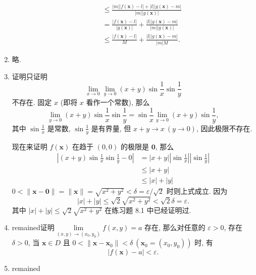 \begin{enumerate}
\begin{enumerate}[(1)]
\begin{align*}
                    &\leqslant \frac{|m||f(\boldsymbol{x}) - l| + |l||g(\boldsymbol{x}) - m|}{|m||g(\boldsymbol{x})|} \\
                    &= \frac{|f(\boldsymbol{x}) - l|}{|g(\boldsymbol{x})|} + \frac{|l||g(\boldsymbol{x}) - m|}{|m||g(\boldsymbol{x})|} \\
                    &\leqslant \frac{|f(\boldsymbol{x}) - l|}{M} + \frac{|l||g(\boldsymbol{x}) - m|}{|m|M}.
                \end{align*}
        \end{enumerate}
    \item %
        略.
    \item %
        {\heiti 证明}\quad 只证明
        \[
            \lim_{x \to 0}\lim_{y \to 0}(x+y)\sin\frac1x\sin\frac1y    
        \]
        不存在.
        固定 $x$ (即将 $x$ 看作一个常数), 那么
        \[
            \lim_{y\to 0}(x + y)\sin\frac1x\sin\frac1y = \sin\frac1x\lim_{y\to 0}(x + y)\sin\frac1y,   
        \]
        其中 $\sin\frac1x$ 是常数, $\sin\frac1y$ 是有界量, 但 $x + y \to x\ (y \to 0)$, 因此极限不存在.
        
        现在来证明 $f(\boldsymbol{x})$ 在趋于 $(0, 0)$ 的极限是 $\boldsymbol{0}$, 那么
        \begin{align*}
            \left| (x+y)\sin\frac1x\sin\frac1y - 0 \right| &= \left| x + y \right|\left|\sin\frac1x\right|\left|\sin\frac1y\right| \\
            &\leqslant |x+y| \\
            &\leqslant |x| + |y|
        \end{align*}
        $0 < \|\boldsymbol{x} - \boldsymbol{0}\| = \|\boldsymbol{x}\| = \sqrt{x^2 + y^2} < \delta = \varepsilon/\sqrt{2}$ 时则上式成立. 因为
        \[
            |x| + |y| \leqslant \sqrt{2}\sqrt{x^2 + y^2} < \sqrt{2}\delta = \varepsilon.    
        \]
        其中 $|x| + |y| \leqslant \sqrt{2}\sqrt{x^2 + y^2}$ 在练习题 8.1 中已经证明过.
    \item %
        {\color{red} remained}{\heiti 证明}\quad $\lim\limits_{(x,y)\to(x_0,y_0)}f(x,y) = a$ 存在, 那么对任意的 $\varepsilon > 0$, 存在 $\delta > 0$, 当 $\boldsymbol{x} \in D$ 且 $0 < \|\boldsymbol{x} - \boldsymbol{x}_0\| < \delta\ (\boldsymbol{x}_0 = (x_0, y_0))$ 时, 有
        \[
            |f(\boldsymbol{x}) - a| < \varepsilon.    
        \]
    \item %
        {\color{red} remained}
\end{enumerate}
% 